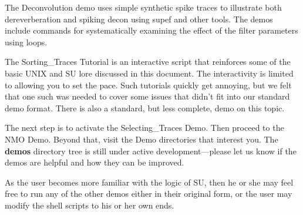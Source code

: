 The Deconvolution demo uses simple synthetic spike traces to
illustrate both dereverberation and spiking decon using supef and
other tools.  The demos include commands for systematically
examining the effect of the filter parameters using loops.

The Sorting\_Traces Tutorial is an interactive script that
reinforces some of the basic UNIX and {\small\sf SU} lore discussed in this
document.  The interactivity is limited to allowing you to set the
pace.  Such tutorials quickly get annoying, but we felt that one
such was needed to cover some issues that didn't fit into our
standard demo format.  There is also a standard, but less complete,
demo on this topic.

The next step is to activate the Selecting\_Traces Demo.  Then
proceed to the NMO Demo.  Beyond that, visit the Demo directories
that interest you.  The {\bf demos} directory tree is still under
active development---please let us know if the demos are helpful and
how they can be improved.

As the user becomes more familiar with the logic of SU, then he or she may
feel free to run any of the other demos either in their original form,
or the user may modify the shell scripts to his or her own ends.

